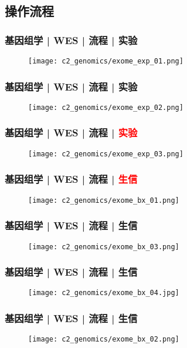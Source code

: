 \subsection{操作流程}
\begin{frame}
  \frametitle{基因组学 | WES | 流程 | 实验}
  \begin{figure}
    \centering
    \texttt{[image: c2\_genomics/exome\_exp\_01.png]}
  \end{figure}
\end{frame}

\begin{frame}
  \frametitle{基因组学 | WES | 流程 | 实验}
  \begin{figure}
    \centering
    \texttt{[image: c2\_genomics/exome\_exp\_02.png]}
  \end{figure}
\end{frame}

\begin{frame}
  \frametitle{基因组学 | WES | 流程 | \textcolor{red}{实验}}
  \begin{figure}
    \centering
    \texttt{[image: c2\_genomics/exome\_exp\_03.png]}
  \end{figure}
\end{frame}

\begin{frame}
  \frametitle{基因组学 | WES | 流程 | \textcolor{red}{生信}}
  \begin{figure}
    \centering
    \texttt{[image: c2\_genomics/exome\_bx\_01.png]}
  \end{figure}
\end{frame}

\begin{frame}
  \frametitle{基因组学 | WES | 流程 | 生信}
  \begin{figure}
    \centering
    \texttt{[image: c2\_genomics/exome\_bx\_03.png]}
  \end{figure}
\end{frame}

\begin{frame}
  \frametitle{基因组学 | WES | 流程 | 生信}
  \begin{figure}
    \centering
    \texttt{[image: c2\_genomics/exome\_bx\_04.jpg]}
  \end{figure}
\end{frame}

\begin{frame}
  \frametitle{基因组学 | WES | 流程 | 生信}
  \begin{figure}
    \centering
    \texttt{[image: c2\_genomics/exome\_bx\_02.png]}
  \end{figure}
\end{frame}

